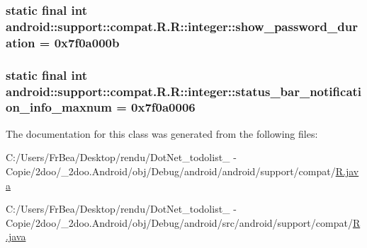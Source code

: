 \hypertarget{classandroid_1_1support_1_1compat_1_1_r_1_1integer_1c5d7d83b6ada846c69099b16244090f}{
\subsubsection[{show\_\-password\_\-duration}]{\setlength{\rightskip}{0pt plus 5cm}static final int android::support::compat.R.R::integer::show\_\-password\_\-duration = 0x7f0a000b}}
\label{classandroid_1_1support_1_1compat_1_1_r_1_1integer_1c5d7d83b6ada846c69099b16244090f}


\hypertarget{classandroid_1_1support_1_1compat_1_1_r_1_1integer_f51795c184e75e1fd6bcf99c15f3b640}{
\subsubsection[{status\_\-bar\_\-notification\_\-info\_\-maxnum}]{\setlength{\rightskip}{0pt plus 5cm}static final int android::support::compat.R.R::integer::status\_\-bar\_\-notification\_\-info\_\-maxnum = 0x7f0a0006}}
\label{classandroid_1_1support_1_1compat_1_1_r_1_1integer_f51795c184e75e1fd6bcf99c15f3b640}




The documentation for this class was generated from the following files:\begin{CompactItemize}
\item 
C:/Users/FrBea/Desktop/rendu/DotNet\_\-todolist\_ - Copie/2doo/\_\-2doo.Android/obj/Debug/android/android/support/compat/\hyperlink{android_2support_2compat_2_r_8java}{R.java}\item 
C:/Users/FrBea/Desktop/rendu/DotNet\_\-todolist\_ - Copie/2doo/\_\-2doo.Android/obj/Debug/android/src/android/support/compat/\hyperlink{src_2android_2support_2compat_2_r_8java}{R.java}\end{CompactItemize}

